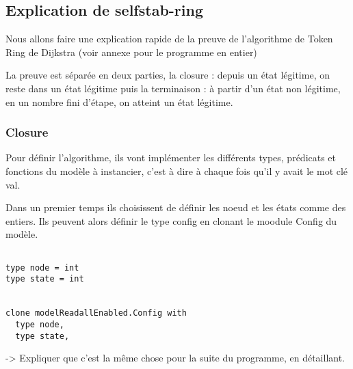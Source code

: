 \documentclass[11pt]{article}
\begin{document}
\subsection{Explication de selfstab-ring}
\label{sec:org35eb5b2}
Nous allons faire une explication rapide de la preuve de l'algorithme de Token Ring de Dijkstra (voir annexe pour le programme en entier)

La preuve est séparée en deux parties, la closure : depuis un état légitime, on reste dans un état légitime 
puis la terminaison : à partir d'un état non légitime, en un nombre fini d'étape, on atteint un état légitime.

\subsubsection{Closure}
\label{sec:orgeaa0095}
Pour définir l'algorithme, ils vont implémenter les différents types, prédicats et fonctions du modèle à instancier, c'est à dire à chaque fois
qu'il y avait le mot clé val.


Dans un premier temps ils choisissent de définir les noeud et les états comme des entiers. 
Ils peuvent alors définir le type config en clonant le moodule Config du modèle. 


\lstset{language=why3,label= ,caption= ,captionpos=b,numbers=none}
\begin{lstlisting}

type node = int
type state = int


clone modelReadallEnabled.Config with
  type node,
  type state,

\end{lstlisting}

-> Expliquer que c'est la même chose pour la suite du programme, en détaillant.
\end{document}
